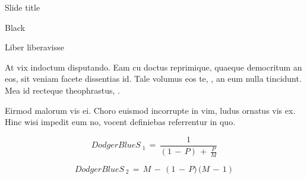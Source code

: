 \documentclass{MichiganTech}
\begin{document}
%
\begin{frame}{Slide title}
  \vspace*{0.10in}
  \begin{reference}{4mm}{84mm}{Black}
    \;
  \end{reference}

  \begin{beamerboxesrounded}[upper=brainstormboxhead,lower=brainstormboxbody,shadow=true]{Liber liberavisse}
    \begin{flushleft}
      At vix indoctum disputando. Eam cu doctus reprimique, quaeque democritum
      an eos, sit veniam facete dissentias id. Tale volumus eos te, ,
      an eum nulla tincidunt. Mea id recteque theophrastus, .

      \vspace*{0.10in}
      Eirmod malorum vis ei. Choro euismod incorrupte in vim, ludus ornatus 
      vis ex. Hinc wisi impedit eum no, vocent definiebas referrentur in quo. 

      \vspace*{0.10in}
      \begin{equation*}
        \boxed{DodgerBlue}{S_{\mathrm{\;1}} \,=\, \frac{1}{\left(1 \,-\, P\right)\, +\, \frac{P}{M}}}
      \end{equation*}

      \vspace*{0.10in}
      \begin{equation*}
        \boxed{DodgerBlue}{S_{\mathrm{\;2}} \,=\, M \,-\, \left( 1 \,-\, P)\,(M \,-\, 1\right)}
      \end{equation*}

      \vspace*{0.10in}
    \end{flushleft}
  \end{beamerboxesrounded}
\end{frame}
\end{document}

